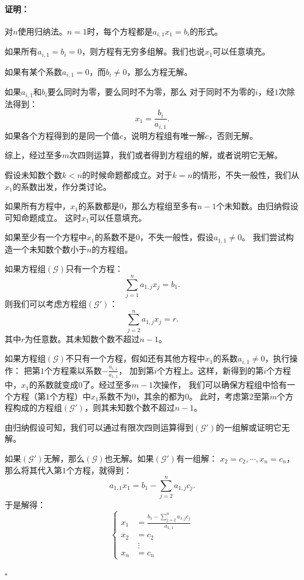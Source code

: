 \documentclass[12pt,UTF8]{ctexbook}
\theoremstyle{definition}
\theoremstyle{plain}
\renewenvironment{proof}{\paragraph{\textbf{证明：}}}{\hfill$\square$}
\begin{document}
\begin{proof}
    对$n$使用归纳法。$n=1$时，每个方程都是$a_{i,1} x_1 = b_i$的形式。

    如果所有$a_{i,1} = b_i = 0$，则方程有无穷多组解。我们也说$x_1$可以任意填充。
    
    如果有某个系数$a_{i,1} = 0$，而$b_i\neq 0$，那么方程无解。

    如果$a_{i,1}$和$b_i$要么同时为零，要么同时不为零，那么
    对于同时不为零的$i$，经$1$次除法得到：
    $$ x_1 = \frac{b_i}{a_{i,1}}. $$
    如果各个方程得到的是同一个值$c$，说明方程组有唯一解$c$，否则无解。

    综上，经过至多$m$次四则运算，我们或者得到方程组的解，或者说明它无解。

    假设未知数个数$k<n$的时候命题都成立。对于$k=n$的情形，不失一般性，我们从$x_1$的系数出发，作分类讨论。

    如果所有方程中，$x_1$的系数都是$0$，那么方程组至多有$n-1$个未知数。由归纳假设可知命题成立。
    这时$x_1$可以任意填充。

    如果至少有一个方程中$x_1$的系数不是$0$，不失一般性，假设$a_{1,1} \neq 0$。
    我们尝试构造一个未知数个数小于$n$的方程组。

    如果方程组$(\mathcal{G})$只有一个方程：
    $$ \sum_{j=1}^n a_{1,j} x_j = b_{1}. $$
    则我们可以考虑方程组$(\mathcal{G}')$：
    $$ \sum_{j=2}^n a_{1,j} x_j = r. $$
    其中$r$为任意数。其未知数个数不超过$n-1$。



    如果方程组$(\mathcal{G})$不只有一个方程，假如还有其他方程中$x_1$的系数$a_{i,1} \neq 0$，执行操作：
    把第$1$个方程乘以系数$-\frac{a_{i,1}}{a_{1,1}}$，
    加到第$i$个方程上。这样，新得到的第$i$个方程中，$x_1$的系数就变成$0$了。经过至多$m-1$次操作，
    我们可以确保方程组中恰有一个方程（第$1$个方程）中$x_1$系数不为$0$，其余的都为$0$。
    此时，考虑第$2$至第$m$个方程构成的方程组$(\mathcal{G}')$，则其未知数个数不超过$n-1$。

    由归纳假设可知，我们可以通过有限次四则运算得到$(\mathcal{G}')$的一组解或证明它无解。

    如果$(\mathcal{G}')$无解，那么$(\mathcal{G})$也无解。如果$(\mathcal{G}')$有一组解：
    $x_2 = c_2, \cdots , x_n = c_n$，那么将其代入第$1$个方程，就得到：
    $$ a_{1,1} x_1 = b_{1} - \sum_{j=2}^n a_{1,j} c_j. $$
    于是解得：
    $$ \left\{
        \begin{array}{rl}
        x_1 &= \displaystyle \frac{b_{1} - \sum_{j=2}^n a_{1,j} c_j}{a_{1,1}} \\
        x_2 &= c_2  \\
        \quad & \:\vdots   \\
        x_n &= c_n 
        \end{array}
    \right.$$


\end{proof}
\end{document}
